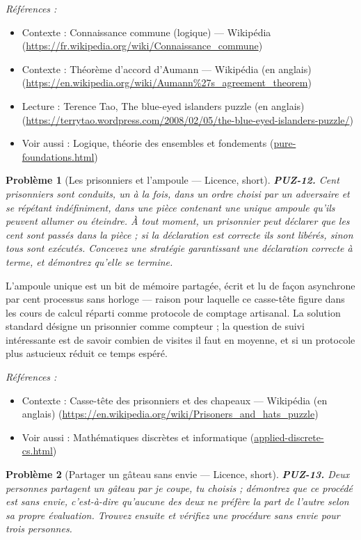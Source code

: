 \documentclass[11pt]{article}
\newtheorem{problem}{Problème}
\newenvironment{refs}{\par\small\noindent\emph{Références :}\begin{itemize}\setlength\itemsep{0pt}}{\end{itemize}\normalsize}
\begin{document}
\begin{refs}
\item Contexte : Connaissance commune (logique) --- Wikipédia (\url{https://fr.wikipedia.org/wiki/Connaissance_commune})
\item Contexte : Théorème d'accord d'Aumann --- Wikipédia (en anglais) (\url{https://en.wikipedia.org/wiki/Aumann%27s_agreement_theorem})
\item Lecture : Terence Tao, \og{} The blue-eyed islanders puzzle \fg{} (en anglais) (\url{https://terrytao.wordpress.com/2008/02/05/the-blue-eyed-islanders-puzzle/})
\item Voir aussi : Logique, théorie des ensembles et fondements (\url{pure-foundations.html})
\end{refs}

\bigskip

\begin{problem}[{Les prisonniers et l'ampoule --- Licence, short}]
\textbf{PUZ-12.} Cent prisonniers sont conduits, un à la fois, dans un
ordre choisi par un adversaire et se répétant indéfiniment, dans une pièce contenant une
unique ampoule qu'ils peuvent allumer ou éteindre. À tout moment, un prisonnier peut
déclarer que les cent sont passés dans la pièce ; si la déclaration est correcte ils sont
libérés, sinon tous sont exécutés. Concevez une stratégie garantissant une déclaration
correcte à terme, et démontrez qu'elle se termine.
\end{problem}

\noindent L'ampoule unique est un bit de mémoire partagée, écrit et lu de façon
asynchrone par cent processus sans horloge --- raison pour laquelle ce casse-tête figure dans
les cours de calcul réparti comme protocole de comptage artisanal. La solution standard
désigne un prisonnier comme compteur ; la question de suivi intéressante est de savoir
combien de visites il faut en moyenne, et si un protocole plus astucieux réduit ce temps
espéré.

\begin{refs}
\item Contexte : Casse-tête des prisonniers et des chapeaux --- Wikipédia (en anglais) (\url{https://en.wikipedia.org/wiki/Prisoners_and_hats_puzzle})
\item Voir aussi : Mathématiques discrètes et informatique (\url{applied-discrete-cs.html})
\end{refs}

\bigskip

\begin{problem}[{Partager un gâteau sans envie --- Licence, short}]
\textbf{PUZ-13.} Deux personnes partagent un gâteau par \og{} je coupe, tu
choisis \fg{} ; démontrez que ce procédé est sans envie, c'est-à-dire qu'aucune des deux ne
préfère la part de l'autre selon sa propre évaluation. Trouvez ensuite et vérifiez une
procédure sans envie pour trois personnes.
\end{problem}
\end{document}
